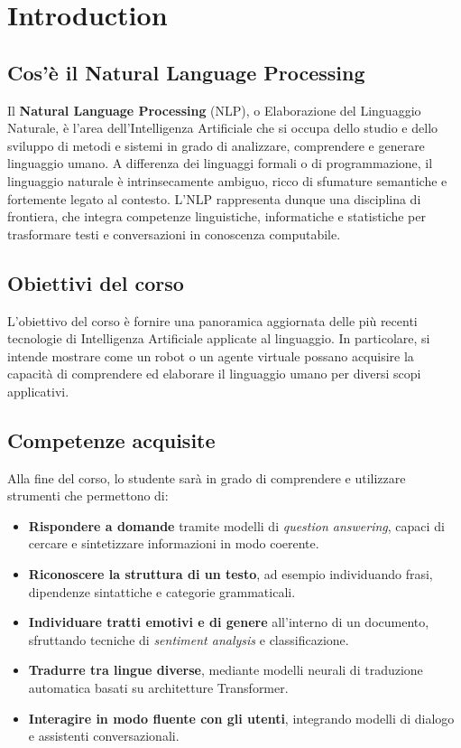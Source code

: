 
\blank
\newpage

\section{Introduction}

    \subsection{Cos'è il Natural Language Processing}
    Il \textbf{Natural Language Processing} (NLP), o Elaborazione del Linguaggio Naturale, è l'area
    dell'Intelligenza Artificiale che si occupa dello studio e dello sviluppo di metodi e sistemi
    in grado di analizzare, comprendere e generare linguaggio umano.
    A differenza dei linguaggi formali o di programmazione, il linguaggio naturale è intrinsecamente ambiguo,
    ricco di sfumature semantiche e fortemente legato al contesto.  
    L'NLP rappresenta dunque una disciplina di frontiera, che integra competenze linguistiche, informatiche e statistiche
    per trasformare testi e conversazioni in conoscenza computabile.
    
    \subsection{Obiettivi del corso}
    L'obiettivo del corso è fornire una panoramica aggiornata delle più recenti tecnologie di
    Intelligenza Artificiale applicate al linguaggio. In particolare, si intende mostrare come un robot
    o un agente virtuale possano acquisire la capacità di comprendere ed elaborare il linguaggio umano
    per diversi scopi applicativi.
    
    \subsection{Competenze acquisite}
    Alla fine del corso, lo studente sarà in grado di comprendere e utilizzare strumenti che permettono di:
    
    \begin{itemize}
      \item \textbf{Rispondere a domande} tramite modelli di \emph{question answering}, capaci di cercare e sintetizzare informazioni in modo coerente.
      \item \textbf{Riconoscere la struttura di un testo}, ad esempio individuando frasi, dipendenze sintattiche e categorie grammaticali.
      \item \textbf{Individuare tratti emotivi e di genere} all'interno di un documento, sfruttando tecniche di \emph{sentiment analysis} e classificazione.
      \item \textbf{Tradurre tra lingue diverse}, mediante modelli neurali di traduzione automatica basati su architetture Transformer.
      \item \textbf{Interagire in modo fluente con gli utenti}, integrando modelli di dialogo e assistenti conversazionali.
    \end{itemize}
    
